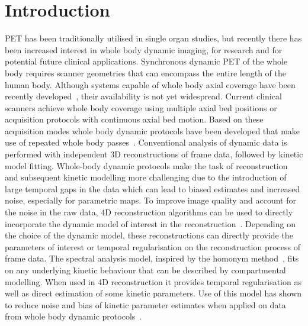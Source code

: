 \section{Introduction}
 PET has been traditionally utilised in single organ studies, but recently there has been increased interest in whole body dynamic imaging, for research and for potential future clinical applications\cite{Lammertsma2017,Leahy2018,Rahmim2019,Fahrni2019}. Synchronous dynamic PET of the whole body requires scanner geometries that can encompass the entire length of the human body. Although systems capable of whole body axial coverage have been recently developed~\cite{Cherry2017}, their availability is not yet widespread. Current clinical scanners achieve whole body coverage using multiple axial bed positions or acquisition protocols with continuous axial bed motion. Based on these acquisition modes whole body dynamic protocols have been developed that make use of repeated whole body passes~\cite{Karakatsanis2013}. 
Conventional analysis of dynamic data is performed with independent 3D reconstructions of frame data, followed by kinetic model fitting. Whole-body dynamic protocols make the task of reconstruction and subsequent kinetic modelling more challenging due to the introduction of large temporal gaps in the data which can lead to biased estimates and increased noise, especially for parametric maps. 
To improve image quality and account for the noise in the raw data, 4D reconstruction algorithms can be used to directly incorporate the dynamic model of interest in the reconstruction~\cite{Reader2014}.
Depending on the choice of the dynamic model, these reconstructions can directly provide the parameters of interest or temporal regularisation on the reconstruction process of frame data. The spectral analysis model, inspired by the homonym method~\cite{Cunningham1993}, fits on any underlying kinetic behaviour that can be described by compartmental modelling. When used in 4D reconstruction it provides temporal regularisation as well as direct estimation of some kinetic parameters. Use of this model has shown to reduce noise and bias of kinetic parameter estimates when applied on data from whole body dynamic protocols~\cite{Chalampalakis2019}.

